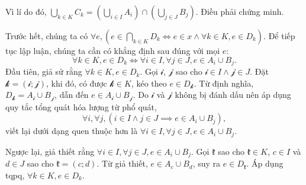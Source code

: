Vì lí do đó, $\bigcup_{k \in K} C_k = \left(\bigcup_{i \in I}A_i\right) \cap \left(\bigcup_{j \in J}B_j\right)$. Điều phải chứng minh.

\stepSubexercise Trước hết, chúng ta có $\forall e, \left(e \in \bigcap_{k \in K} D_k \iff e \in x \land \forall k \in K, e \in D_k\right)$. Để tiếp tục lập luận, chúng ta cần có khẳng định sau đúng với mọi $e$: \begin{equation*}
   \forall k \in K, e \in D_k \iff \forall i \in I, \forall j \in J, e \in A_i \cup B_j.
\end{equation*}
Đầu tiên, giả sử rằng $\forall k \in K, e \in D_k$. Gọi $\mathcal{i}$, $\mathcal{j}$ sao cho $\mathcal{i} \in I \land \mathcal{j} \in J$. Đặt $\mathcal{k} = \left(\mathcal{i}; \mathcal{j}\right)$, khi đó, có được $\mathcal{k} \in K$, kéo theo $e \in D_\mathcal{k}$. Từ định nghĩa, $D_\mathcal{k} = A_\mathcal{i} \cup B_\mathcal{j}$, dẫn đến $e \in A_\mathcal{i} \cup B_\mathcal{j}$. Do $\mathcal{i}$ và $\mathcal{j}$ không bị đánh dấu nên áp dụng quy tắc tổng quát hóa lượng từ phổ quát, \begin{equation*}
   \forall i, \forall j, \left(i \in I \land j \in J \implies e \in A_i \cup B_j\right),
\end{equation*}
viết lại dưới dạng quen thuộc hơn là $\forall i \in I, \forall j \in J, e \in A_i \cup B_j$.

Ngược lại, giả thiết rằng $\forall i \in I, \forall j \in J, e \in A_i \cup B_j$. Gọi $\mathfrak{k}$ sao cho $\mathfrak{k} \in K$, $c \in I$ và $d \in J$ sao cho $\mathfrak{k} = (c; d)$. Từ giả thiết, $e \in A_c \cup B_d$, suy ra $e \in D_\mathfrak{k}$. Áp dụng tqpq, $\forall k \in K, e \in D_k$.

